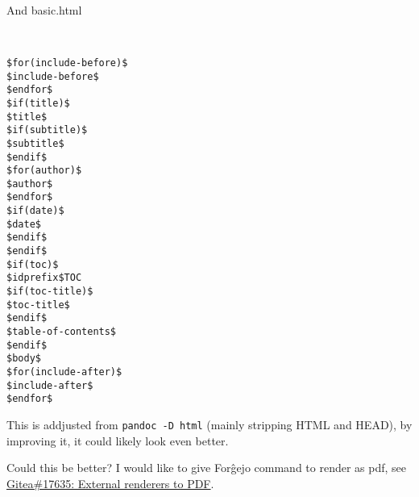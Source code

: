 \documentclass[a4paper,colorlinks,linkcolor=blue]{artikel3}
\begin{document}
And basic.html

\begin{verbatim}


$for(include-before)$
$include-before$
$endfor$
$if(title)$
$title$
$if(subtitle)$
$subtitle$
$endif$
$for(author)$
$author$
$endfor$
$if(date)$
$date$
$endif$
$endif$
$if(toc)$
$idprefix$TOC
$if(toc-title)$
$toc-title$
$endif$
$table-of-contents$
$endif$
$body$
$for(include-after)$
$include-after$
$endfor$
\end{verbatim}

This is addjusted from \texttt{pandoc -D html} (mainly stripping HTML and HEAD), by improving it, it could likely look even better.

Could this be better?
I would like to give For\^gejo command to render as pdf, see
\href{https://github.com/go-gitea/gitea/issues/17635}{Gitea\#17635: External renderers to PDF}.
\end{document}
